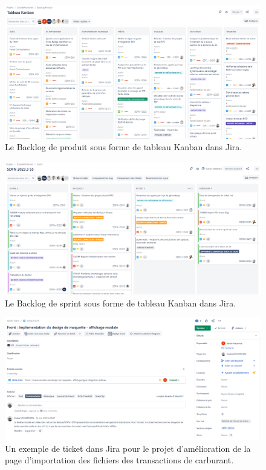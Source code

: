 \begin{appendices}
    \begin{figure}[h]
        \centering
        \includegraphics[width=\textwidth]{img/product-backlog}
        \caption{Le Backlog de produit sous forme de tableau Kanban dans Jira.}
        \label{fig:product-backlog}
    \end{figure}

    \begin{figure}[h]
        \centering
        \includegraphics[width=\textwidth]{img/sprint}
        \caption{Le Backlog de sprint sous forme de tableau Kanban dans Jira.}
        \label{fig:sprint}
    \end{figure}

    \begin{figure}[h]
        \centering
        \includegraphics[width=\textwidth]{img/ticket}
        \caption{Un exemple de ticket dans Jira pour le projet d'amélioration de la page d'importation des fichiers des transactions de carburant.}
        \label{fig:ticket}
    \end{figure}

\end{appendices}